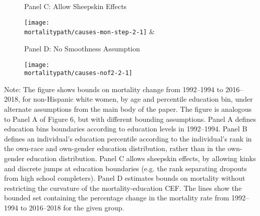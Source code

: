 \documentclass[12pt,letterpaper]{article}
\begin{document}
\begin{figure}[H]
  \begin{center}
    \vspace{-.6cm}
    Panel C: Allow Sheepskin Effects
  \end{center}
  \begin{center}
    \texttt{[image: \\mortalitypath/causes-mon-step-2-1]} &
  \end{center}
  \begin{center}
    \vspace{-.6cm}
    Panel D: No Smoothness Assumption
  \end{center}
  \begin{center}
    \texttt{[image: \\mortalitypath/causes-nof2-2-1]} \\
  \end{center}
\end{figure}
\vspace{-1cm}
\tiny{Note: The figure shows bounds on mortality change from 1992--1994 to 2016--2018, for non-Hispanic white women, by age and percentile education bin, under alternate assumptions from the main body of the paper. The figure is analogous to Panel A of Figure 6, but with different bounding assumptions. Panel A defines education bins boundaries according to education levels in 1992--1994. Panel B defines an individual's education percentile according to the individual's rank in the own-race and own-gender education distribution, rather than in the own-gender education distribution. Panel C allows sheepskin effects, by allowing kinks and discrete jumps at education boundaries (e.g. the rank separating dropouts from high school completers). Panel D estimates bounds on mortality without restricting the curvature of the mortality-education CEF.  The lines show the bounded set containing the percentage change in the mortality rate from 1992--1994 to 2016--2018 for the given group.}
\end{document}
